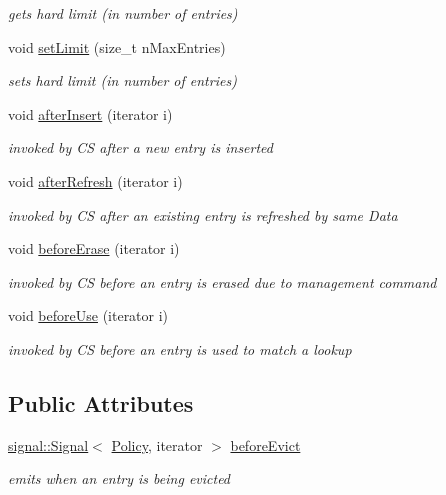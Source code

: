 \begin{DoxyCompactItemize}
\begin{DoxyCompactList}\small\item\em gets hard limit (in number of entries) \end{DoxyCompactList}\item 
void \hyperlink{classnfd_1_1cs_1_1Policy_a3b28312dba54880444eaf988c5e5307c}{set\+Limit} (size\+\_\+t n\+Max\+Entries)
\begin{DoxyCompactList}\small\item\em sets hard limit (in number of entries) \end{DoxyCompactList}\item 
void \hyperlink{classnfd_1_1cs_1_1Policy_af0967e5954ce5a93337639b410e26b8b}{after\+Insert} (iterator i)
\begin{DoxyCompactList}\small\item\em invoked by CS after a new entry is inserted \end{DoxyCompactList}\item 
void \hyperlink{classnfd_1_1cs_1_1Policy_a410f764bbb0cfef48fb81a52cda6d5aa}{after\+Refresh} (iterator i)
\begin{DoxyCompactList}\small\item\em invoked by CS after an existing entry is refreshed by same Data \end{DoxyCompactList}\item 
void \hyperlink{classnfd_1_1cs_1_1Policy_a6128ef4e5f3797b565c9ba05f904fc0d}{before\+Erase} (iterator i)
\begin{DoxyCompactList}\small\item\em invoked by CS before an entry is erased due to management command \end{DoxyCompactList}\item 
void \hyperlink{classnfd_1_1cs_1_1Policy_a6220902b78b80f07b0d0c862c1ac432e}{before\+Use} (iterator i)
\begin{DoxyCompactList}\small\item\em invoked by CS before an entry is used to match a lookup \end{DoxyCompactList}\end{DoxyCompactItemize}
\subsection*{Public Attributes}
\begin{DoxyCompactItemize}
\item 
\hyperlink{classndn_1_1util_1_1signal_1_1Signal}{signal\+::\+Signal}$<$ \hyperlink{classnfd_1_1cs_1_1Policy}{Policy}, iterator $>$ \hyperlink{classnfd_1_1cs_1_1Policy_a442af19fefa3fbe0267471117149c998}{before\+Evict}
\begin{DoxyCompactList}\small\item\em emits when an entry is being evicted \end{DoxyCompactList}\end{DoxyCompactItemize}
